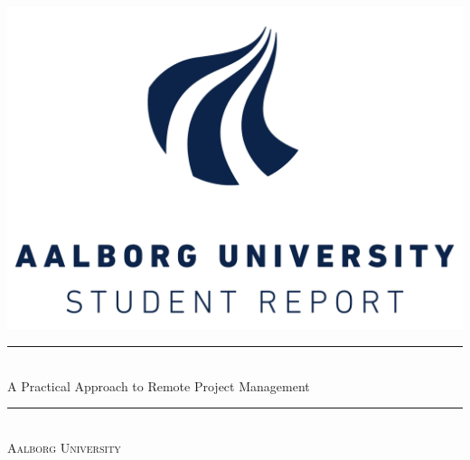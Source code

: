 \begin{titlingpage}

  \centering
  \includegraphics[scale=0.50]{images/aau_logo.pdf}\\[2 cm]
  \rule{\linewidth}{0.2 mm} \\[0.3 cm]
  {\Large A Practical Approach to Remote Project Management} \\[0.1 cm]
  \rule{\linewidth}{0.2 mm} \\[0.5 cm]
  \textsc{\large Aalborg University}\\[0.5 cm]
  {\Large \groupnumber}\\[0.5 cm]

\end{titlingpage}
